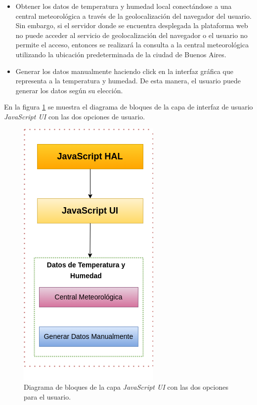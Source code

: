  \begin{itemize}
	\item Obtener los datos de temperatura y humedad local conectándose a una central meteorológica a través de la geolocalización del navegador del usuario. Sin embargo, si el servidor donde se encuentra desplegada la plataforma web no puede acceder al servicio de geolocalización del navegador o el usuario no permite el acceso, entonces se realizará la consulta a la central meteorológica utilizando la ubicación predeterminada de la ciudad de Buenos Aires.
	
	\item Generar los datos manualmente haciendo click en la interfaz gráfica que representa a la temperatura y humedad. De esta manera, el usuario puede generar los datos según su elección.
\end{itemize}

En la figura \ref{fig:uiDht11} se muestra el diagrama de bloques de la capa de interfaz de usuario \textit{JavaScript UI} con las dos opciones de usuario.

\begin{figure}[ht]
	\centering
	\includegraphics[scale=.57]{./Figures/uiDht11.png}
	\caption{Diagrama de bloques de la capa \textit{JavaScript UI} con las dos opciones para el usuario.}
	\label{fig:uiDht11}
\end{figure}

